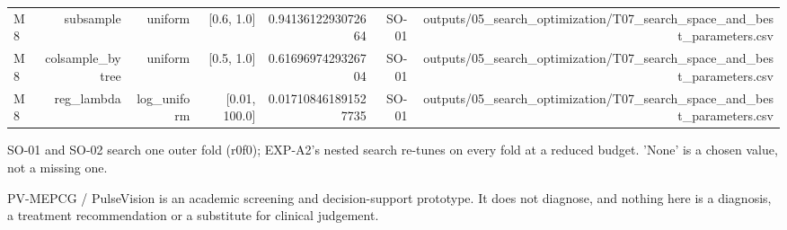 \begin{table}[htbp]
\begin{tabular}{lrrrrrr}
    M8 & subsample & uniform & [0.6, 1.0] & 0.9413612293072664 & SO-01 & outputs/05\_search\_optimization/T07\_search\_space\_and\_best\_parameters.csv \\
    M8 & colsample\_bytree & uniform & [0.5, 1.0] & 0.6169697429326704 & SO-01 & outputs/05\_search\_optimization/T07\_search\_space\_and\_best\_parameters.csv \\
    M8 & reg\_lambda & log\_uniform & [0.01, 100.0] & 0.017108461891527735 & SO-01 & outputs/05\_search\_optimization/T07\_search\_space\_and\_best\_parameters.csv \\
    \bottomrule
  \end{tabular}
  \par\footnotesize SO-01 and SO-02 search one outer fold (r0f0); EXP-A2's nested search re-tunes on every fold at a reduced budget. 'None' is a chosen value, not a missing one.
  \par\footnotesize PV-MEPCG / PulseVision is an academic screening and decision-support prototype. It does not diagnose, and nothing here is a diagnosis, a treatment recommendation or a substitute for clinical judgement.
\end{table}
